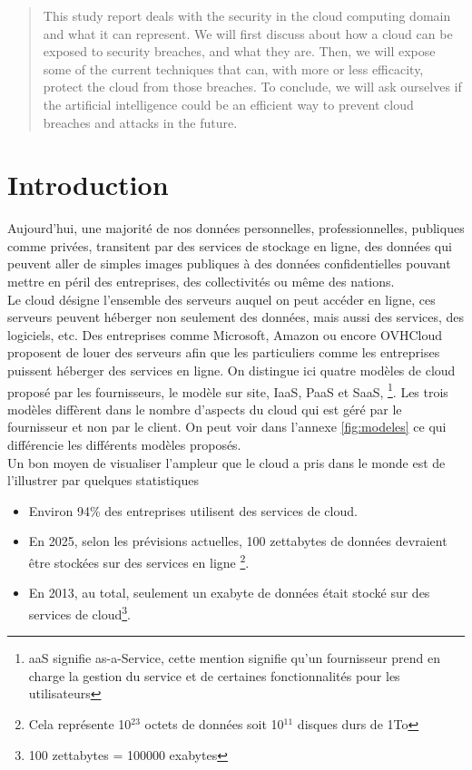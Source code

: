 \documentclass[a4paper, 12pt]{article}
\begin{document}
\begin{spacing}{1.1}
  \begin{abstract}
    This study report deals with the security in the cloud computing domain and
    what it can represent. We will first discuss about how a cloud can be
    exposed to security breaches, and what they are. Then, we will expose some
    of the current techniques that can, with more or less efficacity, protect
    the cloud from those breaches. To conclude, we will ask ourselves if the
    artificial intelligence could be an efficient way to prevent cloud breaches
    and attacks in the future.
  \end{abstract}

  \newpage
  \section{Introduction}
    Aujourd'hui, une majorité de nos données personnelles, professionnelles,
    publiques comme privées, transitent par des services de stockage en ligne,
    des données qui peuvent aller de simples images publiques à des données
    confidentielles pouvant mettre en péril des entreprises, des collectivités
    ou même des nations. \\

    Le cloud désigne l'ensemble des serveurs auquel on peut accéder en ligne,
    ces serveurs peuvent héberger non seulement des données, mais aussi des
    services, des logiciels, etc. Des entreprises comme Microsoft, Amazon ou
    encore OVHCloud proposent de louer des serveurs afin que les particuliers
    comme les entreprises puissent héberger des services en ligne. On distingue
    ici quatre modèles de cloud proposé par les fournisseurs, le modèle sur
    site, IaaS, PaaS et SaaS, \footnote{aaS signifie as-a-Service, cette mention
    signifie qu'un fournisseur prend en charge la gestion du service et de
    certaines fonctionnalités pour les utilisateurs}. Les trois modèles
    diffèrent dans le nombre d'aspects du cloud qui est géré par le fournisseur
    et non par le client. On peut voir dans l'annexe \ref{fig:modeles} ce qui
    différencie les différents modèles proposés. \\

    Un bon moyen de visualiser l'ampleur que le cloud a pris dans le monde est
    de l'illustrer par quelques statistiques

    \begin{itemize}
      \item Environ 94\% des entreprises utilisent des services de cloud.
      \item En 2025, selon les prévisions actuelles, 100 zettabytes de données
            devraient être stockées sur des services en ligne
            \footnote{Cela représente 10$^{23}$ octets de données soit
            10$^{11}$ disques durs de 1To}.
      \item En 2013, au total, seulement un exabyte de données était stocké
            sur des services de cloud\footnote{100 zettabytes = 100000
            exabytes}.
    \end{itemize}


\end{spacing}
\end{document}

